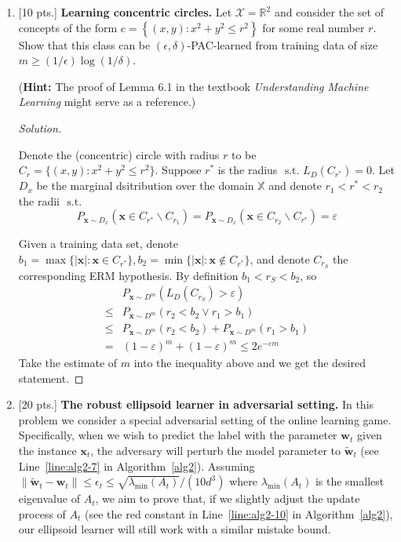 \documentclass[12pt,letterpaper]{article}
\newenvironment{solution}{%
  \begin{proof}[Solution]$ $\par\nobreak\ignorespaces
}{%
  \end{proof}
}
\def \x{\boldsymbol{x}}
\newcommand{\st}{\text{ s.t. }}
\begin{document}
\begin{enumerate}
\item {[10 pts.]}
{\bf Learning concentric circles.} Let $\mathcal{X}=\mathbb{R}^{2}$ and consider the set of concepts of the form $c=\left\{(x, y): x^{2}+y^{2} \leq r^{2}\right\}$ for some real number $r .$ Show that this class can be $(\epsilon, \delta)$-PAC-learned from training data of size $m \geq(1 / \epsilon) \log (1 / \delta)$.

(\textbf{Hint:} The proof of Lemma 6.1 in the textbook \textit{Understanding Machine Learning} might serve as a reference.)
\begin{solution}
  Denote the (concentric) circle with radius $r$ to be $C_{r}=\{(x,y):x^{2}+y^{2}\leq r^{2}\}$. Suppose $r^{*}$ is the radius $\st L_{D}(C_{r^{*}})=0$. Let $D_{x}$ be the marginal dsitribution over the domain $\mathbb{X}$ and denote $r_{1}<r^{*}<r_{2}$ the radii $\st$
  \[P_{\x\sim D_{x}}(\x\in C_{r^{*}}\backslash C_{r_{1}})=P_{\x\sim D_{x}}(\x\in C_{r_{2}}\backslash C_{r^{*}})=\varepsilon\]

  Given a training data set, denote $b_{1}=\max\{|\x|:\x\in C_{r^{*}}\}, b_{2}=\min\{|\x|:\x\not\in C_{r^{*}}\}$, and denote $C_{r_{S}}$ the corresponding ERM hypothesis. By definition $b_{1}<r_{S}<b_{2}$, so
\begin{align*}
  &P_{\x\sim D^{m}}(L_{D}(C_{r_{S}})>\varepsilon)\\
  \leq& P_{\x\sim D^{m}}(r_{2}<b_{2}\lor r_{1}>b_{1})\\
  \leq& P_{\x\sim D^{m}}(r_{2}<b_{2})+P_{\x\sim D^{m}}(r_{1}>b_{1})\\
  =&(1-\varepsilon)^{m}+(1-\varepsilon)^{m}\leq 2e^{-\varepsilon m}
\end{align*}
Take the estimate of $m$ into the inequality above and we get the desired statement.
\end{solution}



\item {[20 pts.]} {\bf The robust ellipsoid learner in adversarial setting.} 
In this problem we consider a special adversarial setting of the online learning game. Specifically, when we wish to predict the label with the parameter $\boldsymbol{w}_t$ given the instance $\x_t$, the adversary will perturb the model parameter to  $\tilde{\boldsymbol{w}}_t$ (see Line~\ref{line:alg2-7} in Algorithm~\ref{alg2}).  Assuming  $\|\tilde{\boldsymbol{w}}_t-\boldsymbol{w}_t\| \leq \epsilon_t \leq \sqrt{\lambda_{\min}(A_t)}/(10d^3)$ where $\lambda_{\min}(A_t)$ is the smallest eigenvalue of $A_t$, we aim to prove that, if we slightly adjust the update process of $A_t$ (see the red constant in Line~\ref{line:alg2-10} in Algorithm~\ref{alg2}), our ellipsoid learner will still work with a similar mistake bound.


\end{enumerate}
\end{document}
